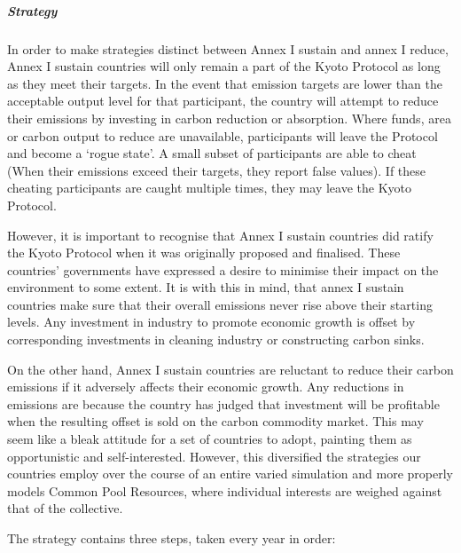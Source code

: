 \subparagraph{Strategy}

In order to make strategies distinct between Annex I sustain and annex I reduce, Annex I sustain countries will only remain a part of the Kyoto Protocol as long as they meet their targets. In the event that emission targets are lower than the acceptable output level for that participant, the country will attempt to reduce their emissions by investing in carbon reduction or absorption. Where funds, area or carbon output to reduce are unavailable, participants will leave the Protocol and become a `rogue state'. A small subset of participants are able to cheat (When their emissions exceed their targets, they report false values). If these cheating participants are caught multiple times, they may leave the Kyoto Protocol.


However, it is important to recognise that Annex I sustain countries did ratify the Kyoto Protocol when it was originally proposed and finalised. These countries' governments have expressed a desire to minimise their impact on the environment to some extent. It is with this in mind, that annex I sustain countries make sure that their overall emissions never rise above their starting levels. Any investment in industry to promote economic growth is offset by corresponding investments in cleaning industry or constructing carbon sinks.

On the other hand, Annex I sustain countries are reluctant to reduce their carbon emissions if it adversely affects their economic growth. Any reductions in emissions are because the country has judged that investment will be profitable when the resulting offset is sold on the carbon commodity market. This may seem like a bleak attitude for a set of countries to adopt, painting them as opportunistic and self-interested. However, this diversified the strategies our countries employ over the course of an entire varied simulation and more properly models Common Pool Resources, where individual interests are weighed against that of the collective.

The strategy contains three steps, taken every year in order:

